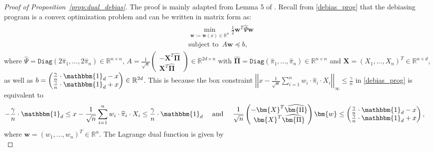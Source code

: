 \documentclass[ejsv2,noshowframe]{imsart}
\theoremstyle{plain}
\theoremstyle{definition}
\theoremstyle{remark}
\newcommand{\norm}[1]{\left|\left| #1 \right|\right|}
\newcommand{\Diag}{\mathtt{Diag}}
\renewcommand{\hat}{\widehat}
\begin{document}
\begin{proof}[Proof of Proposition~\ref{prop:dual_debias}]
	The proof is mainly adapted from Lemma 5 of \cite{giessing2021inference}. Recall from \eqref{debias_prog} that the debiasing program is a convex optimization problem and can be written in matrix form as:
	\begin{align}
		\label{debias_prog_mat}
		\begin{split}
			&\min_{\bm{w}:=\bm{w}(x)\in \mathbb{R}^n} \frac{1}{2}\bm{w}^T \hat{\Psi} \bm{w}\\
			&\text{subject to } \,A\bm{w} \preceq b,
		\end{split}
	\end{align}
	where $\hat{\Psi}=\Diag\left(2\hat{\pi}_1,...,2\hat{\pi}_n \right)\in \mathbb{R}^{n\times n}$, $A= \frac{1}{\sqrt{n}} \begin{pmatrix}
		-\bm{X}^T \hat{\bm{\Pi}}\\
		\bm{X}^T \hat{\bm{\Pi}}
	\end{pmatrix} \in \mathbb{R}^{2d\times n}$ with $\hat{\bm{\Pi}}=\Diag\left(\hat{\pi}_1,...,\hat{\pi}_n\right)\in \mathbb{R}^{n\times n}$ and $\bm{X}=(X_1,...,X_n)^T \in \mathbb{R}^{n\times d}$, as well as $b=\begin{pmatrix}
		\frac{\gamma}{n}\cdot \mathbbm{1}_d -x\\
		\frac{\gamma}{n}\cdot \mathbbm{1}_d +x
	\end{pmatrix} \in \mathbb{R}^{2d}$. This is because the box constraint $\norm{x- \frac{1}{\sqrt{n}}\sum_{i=1}^n w_i\cdot \hat{\pi}_i\cdot X_i }_{\infty} \leq \frac{\gamma}{n}$ in \eqref{debias_prog} is equivalent to
	\begin{align*}
		-\frac{\gamma}{n}\cdot\mathbbm{1}_d \leq x- \frac{1}{\sqrt{n}}\sum_{i=1}^n w_i\cdot \hat{\pi}_i\cdot X_i \leq \frac{\gamma}{n} \cdot \mathbbm{1}_d
		&\quad \text{ and } \quad \frac{1}{\sqrt{n}} \begin{pmatrix}
			-\bm{X}^T \hat{\bm{\Pi}}\\
			\bm{X}^T \hat{\bm{\Pi}}
		\end{pmatrix} \bm{w} \leq \begin{pmatrix}
			\frac{\gamma}{n}\cdot \mathbbm{1}_d -x\\
			\frac{\gamma}{n}\cdot \mathbbm{1}_d +x
		\end{pmatrix},
	\end{align*}
	where $\bm{w}=(w_1,...,w_n)^T \in \mathbb{R}^n$. The Lagrange dual function is given by
	\begin{equation}
		\label{lagrange_func}

\end{equation}
\end{proof}
\end{document}
